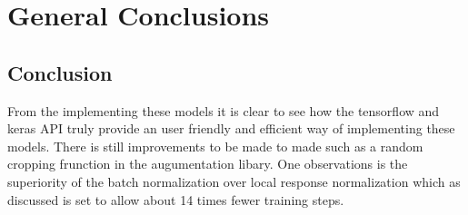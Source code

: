 \chapter{General Conclusions}
\label{chapterlabel4}

    \section{Conclusion}
  From the implementing these models it is clear to see how the tensorflow and keras API truly provide an user friendly and efficient way of implementing these models.
  There is still improvements to be made to made such as a random cropping frunction in the augumentation libary.
  One observations is the superiority of the batch normalization over local response normalization which as discussed \citep{ioffe2015batch}  is set to allow about 14 times fewer training steps.
